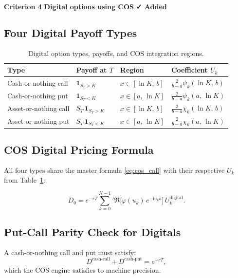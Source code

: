 \documentclass[12pt, a4paper]{article}
\theoremstyle{definition}
\newcommand{\ii}{\mathrm{i}}
\newcommand{\crit}[2]{%
  \noindent\colorbox{#1!15}{\color{#1}\textbf{Criterion #2}}\quad}
\begin{document}
\crit{critred}{4} \textbf{Digital options using COS} \hfill \textcolor{critred}{\textbf{✓ Added}}

\subsection{Four Digital Payoff Types}

\begin{table}[H]
  \centering
  \caption{Digital option types, payoffs, and COS integration regions.}
  \label{tab:digital}
  \begin{tabular}{llll}
    \toprule
    \textbf{Type} & \textbf{Payoff at $T$} & \textbf{Region} & \textbf{Coefficient $U_k$}\\
    \midrule
    Cash-or-nothing call  & $\mathbf{1}_{S_T>K}$     & $x\in[\ln K,\,b]$ & $\tfrac{2}{b-a}\psi_k(\ln K,\,b)$\\
    Cash-or-nothing put   & $\mathbf{1}_{S_T<K}$     & $x\in[a,\,\ln K]$ & $\tfrac{2}{b-a}\psi_k(a,\,\ln K)$\\
    Asset-or-nothing call & $S_T\,\mathbf{1}_{S_T>K}$& $x\in[\ln K,\,b]$ & $\tfrac{2}{b-a}\chi_k(\ln K,\,b)$\\
    Asset-or-nothing put  & $S_T\,\mathbf{1}_{S_T<K}$& $x\in[a,\,\ln K]$ & $\tfrac{2}{b-a}\chi_k(a,\,\ln K)$\\
    \bottomrule
  \end{tabular}
\end{table}

\subsection{COS Digital Pricing Formula}

All four types share the master formula \eqref{eq:cos_call} with their
respective $U_k$ from Table~\ref{tab:digital}:

\begin{equation}
  D_0 = e^{-rT}\sum_{k=0}^{N-1}{}'
        \Re\!\bigl[\varphi(u_k)\,e^{-\ii u_k a}\bigr]\,U_k^{\text{digital}}.
\end{equation}

\subsection{Put-Call Parity Check for Digitals}

A cash-or-nothing call and put must satisfy:
\begin{equation}
  D^{\text{cash-call}} + D^{\text{cash-put}} = e^{-rT},
\end{equation}
which the COS engine satisfies to machine precision.
\end{document}
